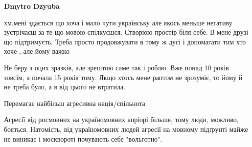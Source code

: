 \begin{itemize}
\begin{itemize}
 

\textbf{Dmytro Dzyuba} 

хм.мені здається що хоча і мало чути українську але якось меньше негативу
зустрічаєш за те що мовою спілкуєшся. Створюю простір біля себе. В мене друзі
що підтримуєть. Треба просто продовжувати в тому ж дусі і допомагати тим хто
хоче , але йому важко

\end{itemize}

 

Не беру з оцих зразків, але зрештою саме так і роблю. Вже понад 10 років
зовсім, а почала 15 років тому. Якщо хтось мене раптом не зрозуміє, то йому й
не треба було, а я від цього не втратила.


 
Перемагає найбільш агресивна нація/спільнота \Smiley[1.0][yellow]

 

Агресії від росмовних на україномовних апріорі більше, тому люди, можливо,
бояться. Натомість, від україномовних людей агресії на мовному підґрунті майже
не виникає і москвороті почувають себе "вольготно".

\begin{itemize}
 

\end{itemize}
\end{itemize}
